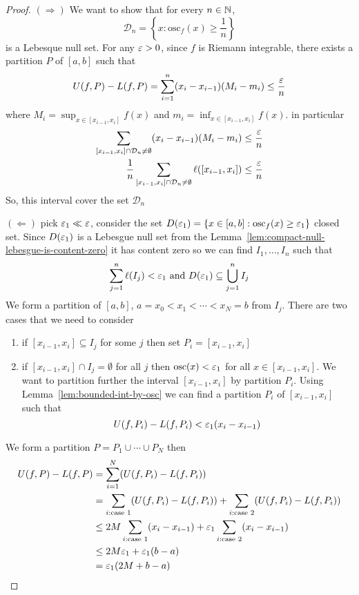 \begin{proof}
  $(\Rightarrow)$ We want to show that for every $n \in \mathbb N$, 
  \[\mathcal{D}_n = \left\{x : \mathrm{osc}_f(x) \ge \frac1n\right\}\]
  is a Lebesque null set. For any $\varepsilon > 0$, since $f$ is Riemann integrable, 
  there exists a partition $P$ of $[a, b]$ such that 
  \[U(f, P) - L(f, P) = \sum_{i = 1}^n (x_i - x_{i-1})(M_i - m_i) \le \frac{\varepsilon} n\]
  where $M_i = \sup_{x\in[x_{i-1}, x_i]}f(x)$ and $m_i = \inf_{x\in[x_{i-1}, x_i]}f(x)$.
  in particular
  \begin{align*}
    \sum_{[x_{i-1}, x_i]\cap \mathcal{D}_n \neq \emptyset}(x_i - x_{i-1})(M_i - m_i) &\le \frac{\varepsilon} n\\
    \frac1n\sum_{[x_{i-1}, x_i]\cap \mathcal{D}_n \neq \emptyset} \ell([x_{i-1}, x_i]) &\le \frac{\varepsilon} n
  \end{align*}
  So, this interval cover the set $\mathcal{D}_n$

  $(\Leftarrow)$ pick $\varepsilon_1 \ll \varepsilon$, consider the set $D(\varepsilon_1) = \{x \in [a, b] : \mathrm{osc}_f(x) \ge \varepsilon_1\}$ closed set.
  Since $D(\varepsilon_1)$ is a Lebesgue null set from the Lemma~\ref{lem:compact-null-lebesgue-is-content-zero}
  it has content zero so we can find $I_1, \dotsc, I_n$ 
  such that 
  \[\sum_{j=1}^n \ell(I_j) < \varepsilon_1 \text{ and } D(\varepsilon_1) \subseteq \bigcup_{j=1}^n I_j\]
  We form a partition of $[a, b]$, $a = x_0 < x_1 < \cdots < x_N = b$ from $I_j$.
  There are two cases that we need to consider
  \begin{enumerate}[1)]
    \item if $[x_{i-1}, x_i] \subseteq I_j$ for some $j$ then set $P_i = [x_{i-1}, x_i]$ 
    \item if $[x_{i-1}, x_i] \cap I_j = \emptyset$ for all $j$ then 
    $\mathrm{osc}(x) < \varepsilon_1$ for all $x \in [x_{i-1}, x_i]$.
    We want to partition further the interval $[x_{i-1}, x_i]$ by partition $P_i$.
    Using Lemma~\ref{lem:bounded-int-by-osc} we can find a partition $P_i$ of $[x_{i-1}, x_i]$ such that
    \[U(f, P_i) - L(f, P_i) < \varepsilon_1(x_i - x_{i-1})\]
  \end{enumerate}
  We form a partition $P = P_1 \cup \cdots \cup P_N$ then
  \begin{align*}
    U(f, P) - L(f, P) &= \sum_{i=1}^{N} (U(f, P_i) - L(f, P_i))\\
    &= \sum_{i: \text{case }1} (U(f, P_i) - L(f, P_i)) + \sum_{i: \text{case }2} (U(f, P_i) - L(f, P_i))\\
    &\le 2M \sum_{i: \text{case }1} (x_i - x_{i-1}) + \varepsilon_1\sum_{i: \text{case }2} (x_i - x_{i-1})\\
    &\le 2M\varepsilon_1 + \varepsilon_1(b-a) \\
    &= \varepsilon_1(2M + b-a)
  \end{align*}
\end{proof}